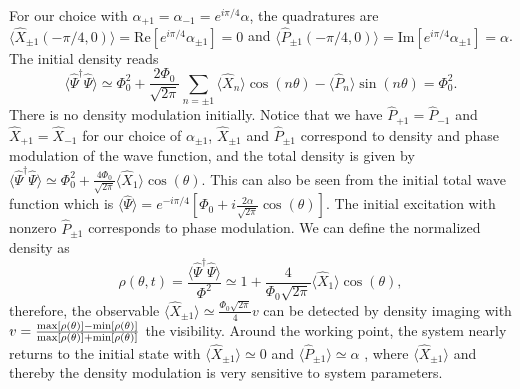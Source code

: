 \documentclass[twocolumn,prl,floatfix,citeautoscript,nofootinbib,superscriptaddress]{revtex4}
\begin{document}
\begin{widetext}
For our choice with $\alpha _{+1}=\alpha _{-1}=e^{i\pi /4}\alpha $, the
quadratures are $\langle \hat{X}_{\pm 1}(-\pi /4,0)\rangle =\mathrm{Re}%
[e^{i\pi /4}\alpha _{\pm 1}]=0$ and $\langle \hat{P}_{\pm 1}(-\pi
/4,0)\rangle =\mathrm{Im}[e^{i\pi /4}\alpha _{\pm 1}]=\alpha $. The initial
density reads
\begin{equation}
\langle \hat{\Psi}^{\dag }\hat{\Psi}\rangle \simeq \Phi _{0}^{2}+\frac{2\Phi
_{0}}{\sqrt{2\pi }}\sum_{n=\pm 1}\langle \hat{X}_{n}\rangle \cos (n\theta
)-\langle \hat{P}_{n}\rangle \sin (n\theta )=\Phi _{0}^{2}.
\end{equation}%
There is no density modulation initially. Notice that we have $\hat{P}_{+1}=%
\hat{P}_{-1}$ and $\hat{X}_{+1}=\hat{X}_{-1}$ for our choice of $\alpha
_{\pm 1}$, $\hat{X}_{\pm 1}$ and $\hat{P}_{\pm 1}$ correspond to density and
phase modulation of the wave function, and the total density is given by $%
\langle \hat{\Psi}^{\dag }\hat{\Psi}\rangle \simeq \Phi _{0}^{2}+\frac{4\Phi
_{0}}{\sqrt{2\pi }}\langle \hat{X}_{1}\rangle \cos (\theta )$. This can also
be seen from the initial total wave function which is $\langle \hat{\Psi}%
\rangle =e^{-i\pi /4}[\Phi _{0}+i\frac{2\alpha }{\sqrt{2\pi }}\cos (\theta
)] $. The initial excitation with nonzero $\hat{P}_{\pm 1}$ corresponds to
phase modulation. We can define the normalized density as
\begin{equation}
\rho (\theta ,t)=\frac{\langle \hat{\Psi}^{\dag }\hat{\Psi}\rangle }{\Phi
^{2}}\simeq 1+\frac{4}{\Phi _{0}\sqrt{2\pi }}\langle \hat{X}_{1}\rangle \cos
(\theta ),
\end{equation}%
therefore, the observable $\langle \hat{X}_{\pm 1}\rangle \simeq \frac{\Phi
_{0}\sqrt{2\pi }}{4}v$ can be detected by density imaging with $v=\frac{%
\mathrm{max}[\rho (\theta )]-\mathrm{min}[\rho (\theta )]}{\mathrm{max}[\rho
(\theta )]+\mathrm{min}[\rho (\theta )]}$ the visibility. Around the working
point, the system nearly returns to the initial state with $\langle \hat{X}%
_{\pm 1}\rangle \simeq 0$ and $\langle \hat{P}_{\pm 1}\rangle \simeq \alpha $%
, where $\langle \hat{X}_{\pm 1}\rangle $ and thereby the density modulation
is very sensitive to system parameters.


\end{widetext}
\end{document}
